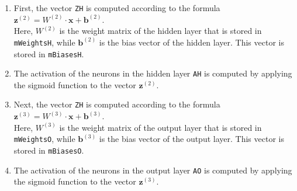 \begin{enumerate}
\item First, the vector \texttt{ZH} is computed according to the formula
      \\[0.2cm]
      \hspace*{1.3cm}
      $\mathbf{z}^{(2)} = W^{(2)} \cdot \mathbf{x} + \mathbf{b}^{(2)}$.
      \\[0.2cm]
      Here, $W^{(2)}$ is the weight matrix of the hidden layer that is stored in \texttt{mWeightsH}, while
      $\mathbf{b}^{(2)}$ is the bias vector of the hidden layer.  This vector is stored in \texttt{mBiasesH}.
\item The activation of the neurons in the hidden layer \texttt{AH} is computed by applying the sigmoid
      function to the vector $\mathbf{z}^{(2)}$.
\item Next, the vector \texttt{ZH} is computed according to the formula
      \\[0.2cm]
      \hspace*{1.3cm}
      $\mathbf{z}^{(3)} = W^{(3)} \cdot \mathbf{x} + \mathbf{b}^{(3)}$.
      \\[0.2cm]
      Here, $W^{(3)}$ is the weight matrix of the output layer that is stored in \texttt{mWeightsO}, while
      $\mathbf{b}^{(3)}$ is the bias vector of the output layer.  This vector is stored in \texttt{mBiasesO}.
\item The activation of the neurons in the output layer \texttt{AO} is computed by applying the sigmoid
      function to the vector $\mathbf{z}^{(3)}$.


\end{enumerate}
